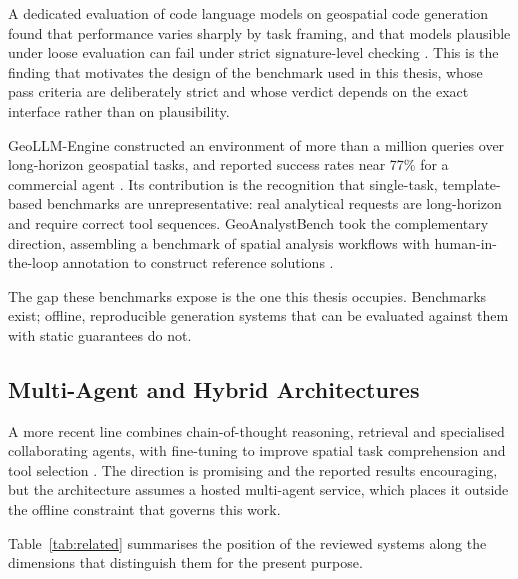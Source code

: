 A dedicated evaluation of code language models on geospatial code generation
found that performance varies sharply by task framing, and that models
plausible under loose evaluation can fail under strict signature-level checking
\cite{evalcodellms2024}. This is the finding that motivates the design of the
benchmark used in this thesis, whose pass criteria are deliberately strict and
whose verdict depends on the exact interface rather than on plausibility.

GeoLLM-Engine constructed an environment of more than a million queries over
long-horizon geospatial tasks, and reported success rates near 77\% for a
commercial agent \cite{singh2024geollmengine}. Its contribution is the
recognition that single-task, template-based benchmarks are unrepresentative:
real analytical requests are long-horizon and require correct tool sequences.
GeoAnalystBench took the complementary direction, assembling a benchmark of
spatial analysis workflows with human-in-the-loop annotation to construct
reference solutions \cite{zhang2025geoanalystbench}.

The gap these benchmarks expose is the one this thesis occupies. Benchmarks
exist; offline, reproducible generation systems that can be evaluated against
them with static guarantees do not.

\subsection{Multi-Agent and Hybrid Architectures}

A more recent line combines chain-of-thought reasoning, retrieval and
specialised collaborating agents, with fine-tuning to improve spatial task
comprehension and tool selection \cite{mansourian2026multia}. The direction is
promising and the reported results encouraging, but the architecture assumes a
hosted multi-agent service, which places it outside the offline constraint that
governs this work.

Table~\ref{tab:related} summarises the position of the reviewed systems along
the dimensions that distinguish them for the present purpose.


